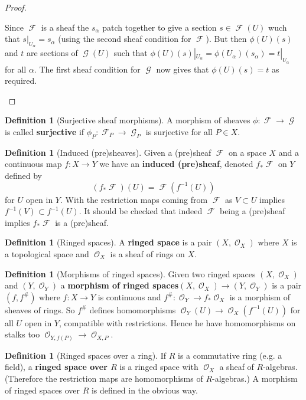 \documentclass[10pt,]{book}
\newcommand{\terminology}[1]{\textbf{#1}}
\theoremstyle{plain}
\theoremstyle{definition}
\newtheorem{definition}[theorem]{Definition}
\DeclareMathOperator{\F}{\mathcal{F}}
\DeclareMathOperator{\G}{\mathcal{G}}
\DeclareMathOperator{\cO}{\mathcal{O}}
\begin{document}
\begin{proof}
\begin{enumerate}
                  Since \(\F\) is a sheaf the \(s_\alpha\) patch together to give a section \(s \in \F(U)\) wuch that \(s|_{U_\alpha} = s_\alpha\) (using the second sheaf condition for \(\F\)).
                  But then \(\phi(U)(s)\) and \(t\) are sections of \(\G(U)\) such that \(\phi(U)(s)|_{U_{\alpha}}  = \phi(U_\alpha)(s_\alpha) = t|_{U_\alpha}\) for all \(\alpha\).
                  The first sheaf condition for \(\G\) now gives that \(\phi(U)(s) = t\) as required.
                \end{enumerate}

\end{proof}
\begin{definition}[Surjective sheaf morphisms]\label{definition-6}
A morphism of sheaves \(\phi\colon \F \to \G\) is called \terminology{surjective} if \(\phi_P\colon \F_P\to\G_P \) is surjective for all \(P \in X\).\end{definition}
\begin{definition}[Induced (pre)sheaves]\label{definition-7}
Given a (pre)sheaf \(\F\) on a space \(X\) and a continuous map \(f\colon X \to Y\) we have an \terminology{induced (pre)sheaf}, denoted \(f_*\F\) on \(Y\) defined by
            \[(f_*\F)(U) = \F(f^{-1}(U))\]
            for \(U\) open in \(Y\).
            With the restriction maps coming from \(\F\) as \(V \subset U\) implies \(f^{-1}(V)\subset f^{-1}(U)\).
            It should be checked that indeed \(\F\) being a (pre)sheaf implies \(f_*\F\) is a (pre)sheaf.
          \end{definition}
\begin{definition}[Ringed spaces]\label{definition-8}
A \terminology{ringed space} is a pair \((X,\cO_X)\) where \(X\) is a topological space and \(\cO_X\) is a sheaf of rings on \(X\).\end{definition}
\begin{definition}[Morphisms of ringed spaces]\label{definition-9}
Given two ringed spaces \((X,\cO_X)\) and \((Y, \cO_Y)\) a \terminology{morphism of ringed spaces}\((X,\cO_X)\to (Y,\cO_Y)\) is a pair \((f,f^\#)\) where \(f\colon X \to Y\) is continuous and \(f^\#\colon \cO_Y \to f_*\cO_X\) is a morphism of sheaves of rings.
            So \(f^\#\) defines homomorphisms \(\cO_Y(U) \to \cO_X(f^{-1}(U))\) for all \(U\) open in \(Y\), compatible with restrictions.
            Hence he have homomorphisms on stalks too \(\cO_{Y,f(P)} \to \cO_{X,P}\).
          \end{definition}
\begin{definition}[Ringed spaces over a ring]\label{definition-10}
If \(R\) is a commutative ring (e.g. a field), a \terminology{ringed space over \(R\)} is a ringed space with \(\cO_X\) a sheaf of \(R\)-algebras.
            (Therefore the restriction maps are homomorphisms of \(R\)-algebras.)
            A morphism of ringed spaces over \(R\) is defined in the obvious way.
          \end{definition}
\end{document}
